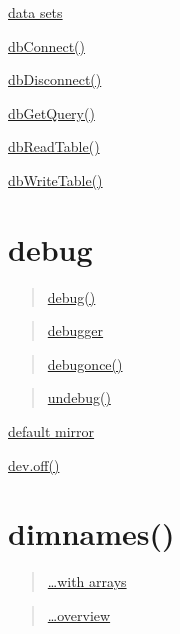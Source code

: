 \documentclass[]{book}
\begin{document}
\href{https://linkedin-learning.pxf.io/rwkly_dataSets}{data sets}

\href{https://linkedin-learning.pxf.io/rweekly_rsqlite}{dbConnect()}

\href{https://linkedin-learning.pxf.io/rweekly_rsqlite}{dbDisconnect()}

\href{https://linkedin-learning.pxf.io/rweekly_rsqlite}{dbGetQuery()}

\href{https://linkedin-learning.pxf.io/rweekly_rsqlite}{dbReadTable()}

\href{https://linkedin-learning.pxf.io/rweekly_rsqlite}{dbWriteTable()}

\hypertarget{debug}{%
\section{debug}\label{debug}}

\begin{quote}
\href{https://linkedin-learning.pxf.io/rweekly_debugonce}{debug()}
\end{quote}

\begin{quote}
\href{https://linkedin-learning.pxf.io/rweekly_browser}{debugger}
\end{quote}

\begin{quote}
\href{https://linkedin-learning.pxf.io/rweekly_debugonce}{debugonce()}
\end{quote}

\begin{quote}
\href{https://linkedin-learning.pxf.io/rweekly_debugonce}{undebug()}
\end{quote}

\href{https://linkedin-learning.pxf.io/rweekly_mirror}{default mirror}

\href{linkedin-learning.pxf.io/rweekly_plottofile}{dev.off()}

\hypertarget{dimnames}{%
\section{dimnames()}\label{dimnames}}

\begin{quote}
\href{https://linkedin-learning.pxf.io/rweekly_array}{\ldots{}with arrays}
\end{quote}

\begin{quote}
\href{https://linkedin-learning.pxf.io/rweekly_dimnames}{\ldots{}overview}
\end{quote}
\end{document}
